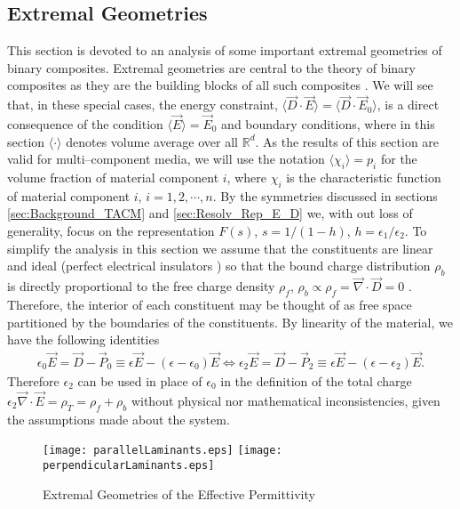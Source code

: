 \documentclass[english,12pt]{ttuthes}
\begin{document}
\subsection{Extremal Geometries}
\label{sec:Extremal_Geometries}
%
This section is devoted to an analysis of some important extremal
geometries of binary composites. Extremal geometries are central to the
theory of binary composites as they are the building blocks of all
such composites \cite{MILTON:2002:TC}. We will see that, in these
special cases, the energy constraint, 
$\langle\vec{D}\cdot\vec{E}\rangle=\langle\vec{D}\cdot\vec{E}_0\rangle$, is a direct consequence
of the condition $\langle\vec{E}\rangle=\vec{E}_0$ and boundary conditions, where
in this section $\langle\cdot\rangle$ denotes volume average over all
$\mathbb{R}^d$. As the results of this section are valid for
multi--component media, we will use the notation $\langle\chi_i\rangle=p_i$ for the
volume fraction of material component $i$, where $\chi_i$ is the
characteristic function of material component $i$, $i=1,2,\cdots,n$. By the
symmetries discussed in sections \ref{sec:Background_TACM} and 
\ref{sec:Resolv_Rep_E_D} we, with out loss of generality, focus on the
representation $F(s)$, $s=1/(1-h)$, $h=\epsilon_1/\epsilon_2$. To simplify the
analysis in this section we assume that the constituents are linear
and ideal (perfect electrical insulators \cite{Reitz-1993}) so that
the bound charge distribution $\rho_b$ is directly proportional to
the free charge density $\rho_f$, $\rho_b\propto\rho_f=\vec{\nabla}\cdot\vec{D}=0$
\cite{Robertson-1993}. Therefore, the interior of each constituent may
be thought of as free space partitioned by the boundaries of the
constituents. By linearity of the material, we have the following
identities 
%
\begin{align}
  \label{eq:fieldRelations}
  \epsilon_0\vec{E}=\vec{D}-\vec{P}_0\equiv\epsilon\vec{E}-(\epsilon-\epsilon_0)\vec{E}\iff
  \epsilon_2\vec{E}=\vec{D}-\vec{P}_2\equiv\epsilon\vec{E}-(\epsilon-\epsilon_2)\vec{E}.
\end{align}
%
Therefore $\epsilon_2$ can be used in place of $\epsilon_0$ in the definition of the
total charge \cite{Jackson-1999,Griffiths-1999}
$\epsilon_2\vec{\nabla}\cdot\vec{E}=\rho_T=\rho_f+\rho_b$ without physical nor mathematical
inconsistencies, given the assumptions made about the system.   
% 
% 
%
\begin{figure}[h!]
\begin{center}
\texttt{[image: parallelLaminants.eps]}%
%
\qquad
\texttt{[image: perpendicularLaminants.eps]}%
\caption{\label{fig:Laminates} Extremal Geometries of the
  Effective Permittivity}
\end{center}
\end{figure}
\end{document}
